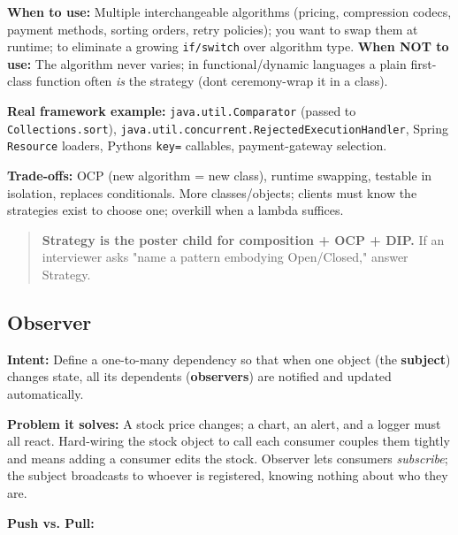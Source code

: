 \documentclass[11pt]{article}
\begin{document}
\textbf{When to use:} Multiple interchangeable algorithms (pricing, compression codecs, payment methods, sorting orders, retry policies); you want to swap them at runtime; to eliminate a growing \texttt{if/switch} over algorithm type. \textbf{When NOT to use:} The algorithm never varies; in functional/dynamic languages a plain first-class function often \emph{is} the strategy (don\textquotesingle t ceremony-wrap it in a class).

\textbf{Real framework example:} \texttt{java.util.Comparator} (passed to \texttt{Collections.sort}), \texttt{java.util.concurrent.RejectedExecutionHandler}, Spring \texttt{Resource} loaders, Python\textquotesingle s \texttt{key=} callables, payment-gateway selection.

\textbf{Trade-offs:} OCP (new algorithm = new class), runtime swapping, testable in isolation, replaces conditionals. More classes/objects; clients must know the strategies exist to choose one; overkill when a lambda suffices.

\begin{quote}
\textbf{Strategy is the poster child for composition + OCP + DIP.} If an interviewer asks "name a pattern embodying Open/Closed," answer Strategy.
\end{quote}

\subsection{Observer}\label{observer}

\textbf{Intent:} Define a one-to-many dependency so that when one object (the \textbf{subject}) changes state, all its dependents (\textbf{observers}) are notified and updated automatically.

\textbf{Problem it solves:} A stock price changes; a chart, an alert, and a logger must all react. Hard-wiring the stock object to call each consumer couples them tightly and means adding a consumer edits the stock. Observer lets consumers \emph{subscribe}; the subject broadcasts to whoever is registered, knowing nothing about who they are.

\textbf{Push vs. Pull:}
\end{document}
